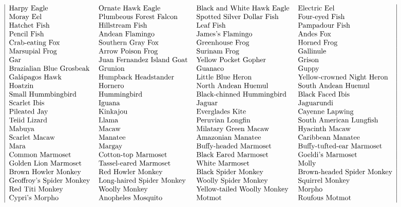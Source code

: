 \[\begin{tabular}{|llll|}
Harpy Eagle   & Ornate Hawk Eagle  & Black and White Hawk Eagle   & Electric Eel  \\
Moray Eel  & Plumbeous Forest Falcon   & Spotted Silver Dollar Fish   & Four-eyed Fish \\
Hatchet Fish   & Hillstream Fish   & Leaf Fish  & Pampadour Fish  \\
Pencil Fish   & Andean Flamingo  & James's Flamingo   & Andes Fox  \\
Crab-eating Fox  & Southern Gray Fox   & Greenhouse Frog   & Horned Frog \\
Marsupial Frog   & Arrow Poison Frog   & Surinam Frog  & Gallinule  \\
Gar   & Juan Fernandez Island Goat  & Yellow Pocket Gopher   & Grison  \\
Brazialian Blue Grosbeak  & Grunion   & Guanaco   & Guppy \\
Gal\'{a}pagos Hawk   & Humpback Headstander   & Little Blue Heron  & Yellow-crowned Night Heron  \\
Hoatzin   & Hornero  & North Andean Huemul   & South Andean Huemul  \\
Small Hummbingbird  & Hummingbird   & Black-chinned Hummingbird   & Black Faced Ibis \\
Scarlet Ibis   & Iguana   & Jaguar  & Jaguarundi  \\
Pileated Jay   & Kinkajou  & Everglades Kite   & Cayenne Lapwing  \\
Teiid Lizard  & Llama   & Peruvian Longfin   & South American Lungfish \\
Mabuya   & Macaw   & Milatary Green Macaw  & Hyacinth Macaw  \\
Scarlet Macaw   & Manatee  & Amazonian Manatee   & Caribbean Manatee  \\
Mara  & Margay   & Buffy-headed Marmoset   & Buffy-tufted-ear Marmoset \\
Common Marmoset   & Cotton-top Marmoset   & Black Eared Marmoset  & Goeldi's Marmoset  \\
Golden Lion Marmoset   & Tassel-eared Marmoset  & White Marmoset   & Molly  \\
Brown Howler Monkey  & Red Howler Monkey   & Black Spider Monkey   & Brown-headed Spider Monkey \\
Geoffroy's Spider Monkey   & Long-haired Spider Monkey   & Woolly Spider Monkey  & Squirrel Monkey  \\
Red Titi Monkey   & Woolly Monkey  & Yellow-tailed Woolly Monkey   & Morpho  \\
Cypri's Morpho  & Anopheles Mosquito   & Motmot   & Roufous Motmot \\

\end{tabular}\]

